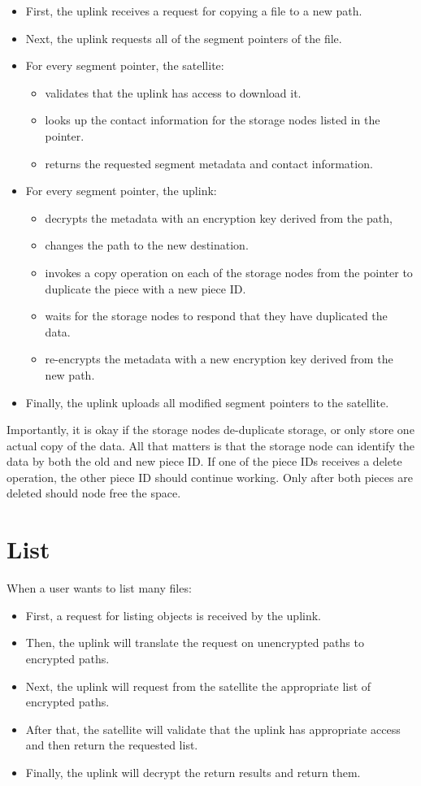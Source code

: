 \documentclass[11pt,fleqn,openany]{book}
\begin{document}
\begin{itemize}
\item First, the uplink receives a request for copying a file to a new path.
\item Next, the uplink requests all of the segment pointers of the file.
\item For every segment pointer, the satellite:
  \begin{itemize}
  \item validates that the uplink has access to download it.
  \item looks up the contact information for the storage nodes listed in the
    pointer.
  \item returns the requested segment metadata and contact information.
  \end{itemize}
\item For every segment pointer, the uplink:
  \begin{itemize}
  \item decrypts the metadata with an encryption key derived from the path,
  \item changes the path to the new destination.
  \item invokes a copy operation on each of the storage nodes from the pointer
    to duplicate the piece with a new piece ID.
  \item waits for the storage nodes to respond that they have duplicated the
    data.
  \item re-encrypts the metadata with a new encryption key derived from the
    new path.
  \end{itemize}
\item Finally, the uplink uploads all modified segment pointers to the satellite.
\end{itemize}

Importantly, it is okay if the storage nodes de-duplicate storage, or only
store one actual copy of the data. All that matters is that the storage node
can identify the data by both the old and new piece ID. If one of the piece
IDs receives a delete operation, the other piece ID should continue working.
Only after both pieces are deleted should node free the space.

\section{List}

When a user wants to list many files:

\begin{itemize}
\item First, a request for listing objects is received by the uplink.
\item Then, the uplink will translate the request on unencrypted paths to encrypted
  paths.
\item Next, the uplink will request from the satellite the appropriate list of
  encrypted paths.
\item After that, the satellite will validate that the uplink has appropriate access
  and then return the requested list.
\item Finally, the uplink will decrypt the return results and return them.
\end{itemize}
\end{document}
